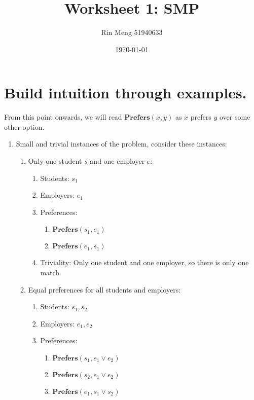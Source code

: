 \documentclass[12pt]{article}
\title{Worksheet 1: SMP}
\author{Rin Meng 51940633}
\date{\today}
\begin{document}
\maketitle

\section{Build intuition through examples.}
    From this point onwards, we will read $\textbf{Prefers}(x, y)$ as $x$ prefers $y$ over some other option.

    \begin{enumerate}
        \item Small and trivial instances of the problem, consider these instances:
            \begin{enumerate}
                \item Only one student $s$ and one employer $e$:
                \begin{enumerate}[-]
                    \item Students: ${s_1}$
                    \item Employers: ${e_1}$
                    \item Preferences: 
                        \begin{enumerate}
                            \item $\textbf{Prefers}(s_1, e_1)$
                            \item $\textbf{Prefers}(e_1, s_1)$
                        \end{enumerate}
                    \item Triviality: Only one student and one employer, so there is only one match.
                \end{enumerate}
                \item Equal preferences for all students and employers:
                \begin{enumerate}
                    \item Students: ${s_1, s_2}$
                    \item Employers: ${e_1, e_2}$
                    \item Preferences:
                        \begin{enumerate}
                            \item $\textbf{Prefers}(s_1, e_1 \lor e_2)$
                            \item $\textbf{Prefers}(s_2, e_1 \lor e_2)$
                            \item $\textbf{Prefers}(e_1, s_1 \lor s_2)$

\end{enumerate}
\end{enumerate}
\end{enumerate}
\end{enumerate}
\end{document}
